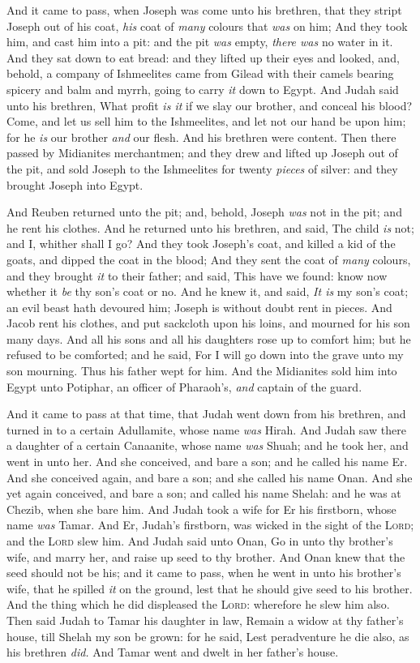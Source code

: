 \documentclass[11pt,letterpaper,oneside]{memoir}
\begin{document}
And it came to pass, when Joseph was come unto his brethren, that they
stript Joseph out of his coat, \emph{his} coat of \emph{many} colours
that \emph{was} on him; And they took him, and cast him into a pit: and
the pit \emph{was} empty, \emph{there was} no water in it. And they sat
down to eat bread: and they lifted up their eyes and looked, and,
behold, a company of Ishmeelites came from Gilead with their camels
bearing spicery and balm and myrrh, going to carry \emph{it} down to
Egypt. And Judah said unto his brethren, What profit \emph{is it} if we
slay our brother, and conceal his blood? Come, and let us sell him to
the Ishmeelites, and let not our hand be upon him; for he \emph{is} our
brother \emph{and} our flesh. And his brethren were content. Then there
passed by Midianites merchantmen; and they drew and lifted up Joseph out
of the pit, and sold Joseph to the Ishmeelites for twenty \emph{pieces}
of silver: and they brought Joseph into Egypt.

And Reuben returned unto the pit; and, behold, Joseph \emph{was} not in
the pit; and he rent his clothes. And he returned unto his brethren, and
said, The child \emph{is} not; and I, whither shall I go? And they took
Joseph's coat, and killed a kid of the goats, and dipped the coat in the
blood; And they sent the coat of \emph{many} colours, and they brought
\emph{it} to their father; and said, This have we found: know now
whether it \emph{be} thy son's coat or no. And he knew it, and said,
\emph{It is} my son's coat; an evil beast hath devoured him; Joseph is
without doubt rent in pieces. And Jacob rent his clothes, and put
sackcloth upon his loins, and mourned for his son many days. And all his
sons and all his daughters rose up to comfort him; but he refused to be
comforted; and he said, For I will go down into the grave unto my son
mourning. Thus his father wept for him. And the Midianites sold him into
Egypt unto Potiphar, an officer of Pharaoh's, \emph{and} captain of the
guard.

And it came to pass at that time, that Judah went down from his
brethren, and turned in to a certain Adullamite, whose name \emph{was}
Hirah. And Judah saw there a daughter of a certain Canaanite, whose name
\emph{was} Shuah; and he took her, and went in unto her. And she
conceived, and bare a son; and he called his name Er. And she conceived
again, and bare a son; and she called his name Onan. And she yet again
conceived, and bare a son; and called his name Shelah: and he was at
Chezib, when she bare him. And Judah took a wife for Er his firstborn,
whose name \emph{was} Tamar. And Er, Judah's firstborn, was wicked in
the sight of the \textsc{Lord}; and the \textsc{Lord} slew him. And Judah
said unto Onan, Go in unto thy brother's wife, and marry her, and raise
up seed to thy brother. And Onan knew that the seed should not be his;
and it came to pass, when he went in unto his brother's wife, that he
spilled \emph{it} on the ground, lest that he should give seed to his
brother. And the thing which he did displeased the \textsc{Lord}:
wherefore he slew him also. Then said Judah to Tamar his daughter in
law, Remain a widow at thy father's house, till Shelah my son be grown:
for he said, Lest peradventure he die also, as his brethren \emph{did.}
And Tamar went and dwelt in her father's house.
\end{document}

